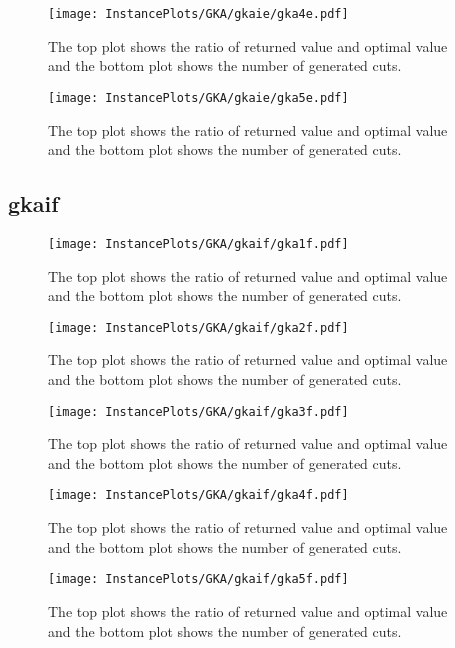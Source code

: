 \documentclass[10pt,a4paper]{article}
\begin{document}
\begin{figure}[H]
\texttt{[image: InstancePlots/GKA/gkaie/gka4e.pdf]}
\caption{The top plot shows the ratio of returned value and optimal value     and the bottom plot shows the number of generated cuts.}
\end{figure}

\begin{figure}[H]
\texttt{[image: InstancePlots/GKA/gkaie/gka5e.pdf]}
\caption{The top plot shows the ratio of returned value and optimal value     and the bottom plot shows the number of generated cuts.}
\end{figure}

\subsection{gkaif}
\begin{figure}[H]
\texttt{[image: InstancePlots/GKA/gkaif/gka1f.pdf]}
\caption{The top plot shows the ratio of returned value and optimal value     and the bottom plot shows the number of generated cuts.}
\end{figure}

\begin{figure}[H]
\texttt{[image: InstancePlots/GKA/gkaif/gka2f.pdf]}
\caption{The top plot shows the ratio of returned value and optimal value     and the bottom plot shows the number of generated cuts.}
\end{figure}

\begin{figure}[H]
\texttt{[image: InstancePlots/GKA/gkaif/gka3f.pdf]}
\caption{The top plot shows the ratio of returned value and optimal value     and the bottom plot shows the number of generated cuts.}
\end{figure}

\begin{figure}[H]
\texttt{[image: InstancePlots/GKA/gkaif/gka4f.pdf]}
\caption{The top plot shows the ratio of returned value and optimal value     and the bottom plot shows the number of generated cuts.}
\end{figure}

\begin{figure}[H]
\texttt{[image: InstancePlots/GKA/gkaif/gka5f.pdf]}
\caption{The top plot shows the ratio of returned value and optimal value     and the bottom plot shows the number of generated cuts.}
\end{figure}
\end{document}
